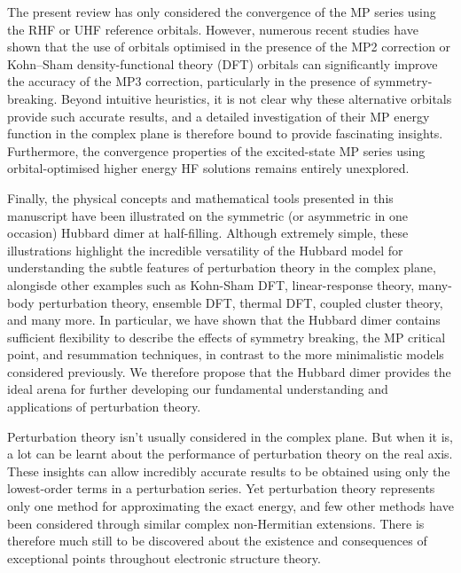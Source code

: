 \documentclass[aps,prb,reprint,noshowkeys,superscriptaddress]{revtex4-1}
\begin{document}
The present review has only considered the convergence of the MP series using the RHF or UHF 
reference orbitals.
However, numerous recent studies have shown that the use of orbitals optimised in the presence of the MP2 
correction\cite{Bozkaya_2011,Neese_2009,Lee_2018} or Kohn--Sham density-functional theory (DFT) orbitals 
can significantly improve the accuracy of the MP3 correction,\cite{Bertels_2019,Rettig_2020}
particularly in the presence of symmetry-breaking.
Beyond intuitive heuristics, it is not clear why these alternative orbitals provide such accurate results, 
and a detailed investigation of their MP energy function in the complex plane is therefore bound to provide
fascinating insights.
Furthermore, the convergence properties of the excited-state MP series using orbital-optimised higher energy 
HF solutions\cite{Gilbert_2008} remains entirely unexplored.\cite{Lee_2019,CarterFenk_2020}

Finally, the physical concepts and mathematical tools presented in this manuscript have been illustrated 
on the symmetric (or asymmetric in one occasion) Hubbard dimer at half-filling.
Although extremely simple, these illustrations highlight the incredible versatility of the Hubbard model
for understanding the subtle features of perturbation theory in the complex plane, alongisde other examples 
such as Kohn-Sham DFT, \cite{Carrascal_2015,Cohen_2016} linear-response theory,\cite{Carrascal_2018} 
many-body perturbation theory,\cite{Romaniello_2009,Romaniello_2012,DiSabatino_2015,Hirata_2015,Tarantino_2017,Olevano_2019} 
ensemble DFT, \cite{Deur_2017,Deur_2018,Senjean_2018,Sagredo_2018,Fromager_2020} thermal DFT,\cite{Smith_2016,Smith_2018} 
coupled cluster theory,\cite{Stein_2014,Henderson_2015,Shepherd_2016} and many more.
In particular, we have shown that the Hubbard dimer contains sufficient flexibility to describe 
the effects of symmetry breaking, the MP critical point, and resummation techniques, in contrast to the more 
minimalistic models considered previously.
We therefore propose that the Hubbard dimer provides the ideal arena for further developing our fundamental understanding
and applications of perturbation theory.

Perturbation theory isn't usually considered in the complex plane. 
But when it is, a lot can be learnt about the performance of perturbation theory on the real axis.
These insights can allow incredibly accurate results to be obtained using only the lowest-order terms in a perturbation series.
Yet perturbation theory represents only one method for approximating the exact energy, and few other methods
have been considered through similar complex non-Hermitian extensions.
There is therefore much still to be discovered about the existence and consequences of exceptional points
throughout electronic structure theory.
\end{document}
